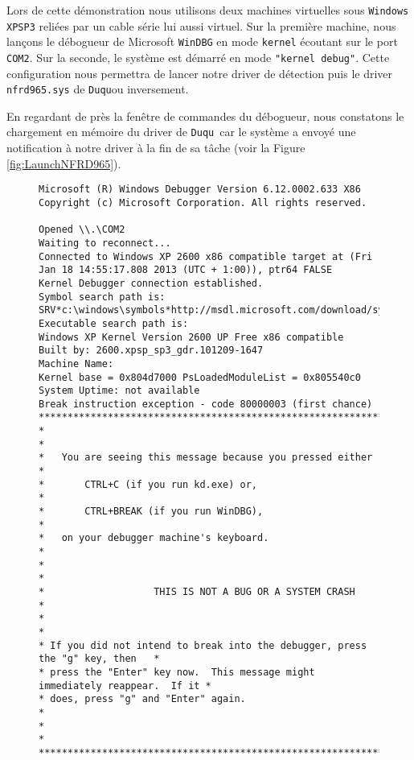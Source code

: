 \documentclass[times,11pt,fullpage]{article}
\newcommand{\Duqu}{\texttt{Duqu}}
\begin{document}
Lors de cette démonstration nous utilisons deux machines virtuelles sous \texttt{Windows XPSP3} reliées par un cable série lui aussi virtuel. Sur la première machine, nous lançons le débogueur de Microsoft \texttt{WinDBG} en mode \texttt{kernel} écoutant sur le port \texttt{COM2}. Sur la seconde, le système est démarré en mode \texttt{"kernel debug"}. Cette configuration nous permettra de lancer notre driver de détection puis le driver \texttt{nfrd965.sys} de \Duqu\space ou inversement.
  
En regardant de près la fenêtre de commandes du débogueur, nous constatons le chargement en mémoire du driver de \Duqu\ car le système a envoyé une notification à notre driver à la fin de sa tâche (voir la Figure \ref{fig:LaunchNFRD965}). 
\begin{figure}
\scriptsize
\begin{verbatim}
Microsoft (R) Windows Debugger Version 6.12.0002.633 X86
Copyright (c) Microsoft Corporation. All rights reserved.

Opened \\.\COM2
Waiting to reconnect...
Connected to Windows XP 2600 x86 compatible target at (Fri Jan 18 14:55:17.808 2013 (UTC + 1:00)), ptr64 FALSE
Kernel Debugger connection established.
Symbol search path is: SRV*c:\windows\symbols*http://msdl.microsoft.com/download/symbols
Executable search path is: 
Windows XP Kernel Version 2600 UP Free x86 compatible
Built by: 2600.xpsp_sp3_gdr.101209-1647
Machine Name:
Kernel base = 0x804d7000 PsLoadedModuleList = 0x805540c0
System Uptime: not available
Break instruction exception - code 80000003 (first chance)
*******************************************************************************
*                                                                             *
*   You are seeing this message because you pressed either                    *
*       CTRL+C (if you run kd.exe) or,                                        *
*       CTRL+BREAK (if you run WinDBG),                                       *
*   on your debugger machine's keyboard.                                      *
*                                                                             *
*                   THIS IS NOT A BUG OR A SYSTEM CRASH                       *
*                                                                             *
* If you did not intend to break into the debugger, press the "g" key, then   *
* press the "Enter" key now.  This message might immediately reappear.  If it *
* does, press "g" and "Enter" again.                                          *
*                                                                             *
*******************************************************************************


\end{verbatim}
\end{figure}
\end{document}
